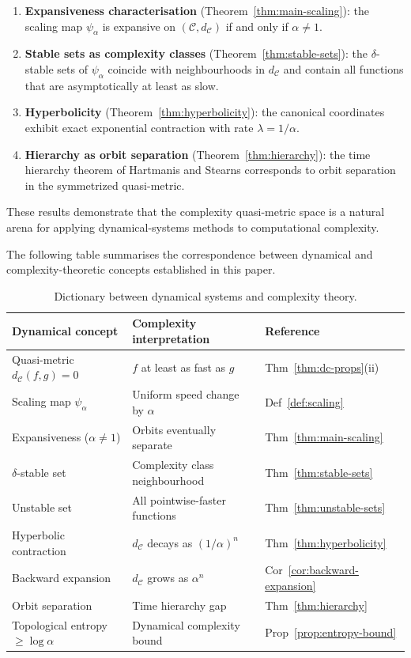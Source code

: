 \documentclass[11pt,a4paper]{article}
\theoremstyle{plain}
\theoremstyle{definition}
\newcommand{\C}{\mathcal{C}}
\begin{document}
\begin{enumerate}[leftmargin=2em]
  \item \textbf{Expansiveness characterisation}
    (Theorem~\ref{thm:main-scaling}): the scaling map $\psi_\alpha$
    is expansive on $(\C,d_\C)$ if and only if $\alpha\neq 1$.
  \item \textbf{Stable sets as complexity classes}
    (Theorem~\ref{thm:stable-sets}): the $\delta$-stable sets of
    $\psi_\alpha$ coincide with neighbourhoods in $d_\C$ and contain
    all functions that are asymptotically at least as slow.
  \item \textbf{Hyperbolicity} (Theorem~\ref{thm:hyperbolicity}):
    the canonical coordinates exhibit exact exponential contraction
    with rate $\lambda=1/\alpha$.
  \item \textbf{Hierarchy as orbit separation}
    (Theorem~\ref{thm:hierarchy}): the time hierarchy theorem of
    Hartmanis and Stearns corresponds to orbit separation in the
    symmetrized quasi-metric.
\end{enumerate}

These results demonstrate that the complexity quasi-metric space is
a natural arena for applying dynamical-systems methods to
computational complexity.

\medskip
The following table summarises the correspondence between dynamical
and complexity-theoretic concepts established in this paper.

\begin{table}[H]
\centering
\renewcommand{\arraystretch}{1.3}
\begin{tabular}{lll}
\hline
\textbf{Dynamical concept} & \textbf{Complexity interpretation} & \textbf{Reference} \\
\hline
Quasi-metric $d_\C(f,g)=0$ & $f$ at least as fast as $g$ & Thm~\ref{thm:dc-props}(ii)\\
Scaling map $\psi_\alpha$ & Uniform speed change by $\alpha$ & Def~\ref{def:scaling}\\
Expansiveness ($\alpha\neq 1$) & Orbits eventually separate & Thm~\ref{thm:main-scaling}\\
$\delta$-stable set & Complexity class neighbourhood & Thm~\ref{thm:stable-sets}\\
Unstable set & All pointwise-faster functions & Thm~\ref{thm:unstable-sets}\\
Hyperbolic contraction & $d_\C$ decays as $(1/\alpha)^n$ & Thm~\ref{thm:hyperbolicity}\\
Backward expansion & $d_\C$ grows as $\alpha^n$ & Cor~\ref{cor:backward-expansion}\\
Orbit separation & Time hierarchy gap & Thm~\ref{thm:hierarchy}\\
Topological entropy $\ge\log\alpha$ & Dynamical complexity bound & Prop~\ref{prop:entropy-bound}\\
\hline
\end{tabular}
\caption{Dictionary between dynamical systems and complexity theory.}
\label{tab:dictionary}
\end{table}
\end{document}
